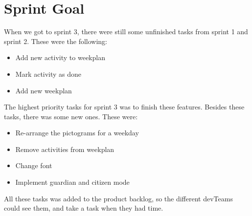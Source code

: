 \section{Sprint Goal}

When we got to sprint 3, there were still some unfinished tasks from sprint 1 and sprint 2. These were the following:
\begin{itemize}
    \item Add new activity to weekplan
    \item Mark activity as done 
    \item Add new weekplan
\end{itemize}

The highest priority tasks for sprint 3 was to finish these features.
Besides these tasks, there was some new ones. These were:
\begin{itemize}
    \item Re-arrange the pictograms for a weekday
    \item Remove activities from weekplan
    \item Change font
    \item Implement guardian and citizen mode
\end{itemize}

All these tasks was added to the product backlog, so the different \glspl{devTeam} could see them, and take a task when they had time.